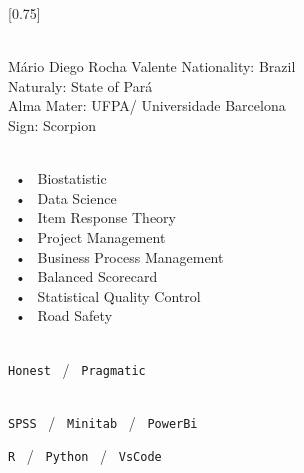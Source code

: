 \documentclass[lighthipster]{simplehipstercv}
\begin{document}
\setlength{\columnsep}{1.5cm}
[0.75]
\begin{paracol}{2}

\paracolbackgroundoptions



\footnotesize
{\setasidefontcolour
\flushright
\begin{center}
\end{center}



{\footnotesize }
\bigskip

 \\[0.5em]
Mário Diego Rocha Valente
Nationality: Brazil \\
Naturaly: State of Pará \\
Alma Mater: UFPA/ Universidade Barcelona \\
Sign: Scorpion

\bigskip

 \\[0.5em]


~•~ Biostatistic \\
~•~ Data Science \\
~•~ Item Response Theory \\
~•~ Project Management \\
~•~  Business Process Management \\
~•~ Balanced Scorecard \\
~•~ Statistical Quality Control \\
~•~ Road Safety \\



\bigskip

\\[0.5em]

\texttt{Honest} ~/~ \texttt{Pragmatic}  


\bigskip

\\[0.5em]

\texttt{SPSS} ~/~ \texttt{Minitab} ~/~ \texttt{PowerBi}

\texttt{R} ~/~ \texttt{Python} ~/~ \texttt{VsCode}

}
\end{paracol}
\end{document}
